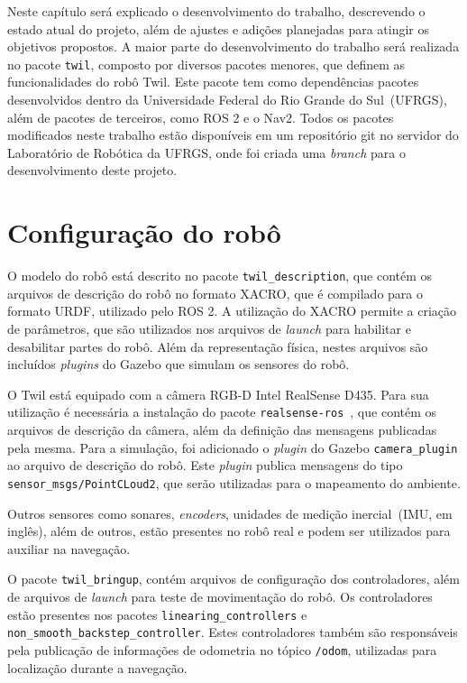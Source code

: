 \documentclass[repeatfields,xlists,xpacks,oneside,yearsonly]{ufrgscca}
\begin{document}
Neste capítulo será explicado o desenvolvimento do trabalho, descrevendo o
estado atual do projeto, além de ajustes e adições planejadas para atingir
os objetivos propostos.
A maior parte do desenvolvimento do trabalho será realizada no pacote \texttt{twil},
composto por diversos pacotes menores, que definem as funcionalidades do robô Twil.
Este pacote tem como dependências pacotes desenvolvidos dentro da
Universidade Federal do Rio Grande do Sul~(UFRGS), além de pacotes de
terceiros, como ROS 2 e o Nav2.
Todos os pacotes modificados neste trabalho estão disponíveis em um repositório git
no servidor do Laboratório de Robótica da UFRGS, onde foi criada uma
\textit{branch} para o desenvolvimento deste projeto.

\section{Configuração do robô}

O modelo do robô está descrito no pacote \texttt{twil\_description}, que contém
os arquivos de descrição do robô no formato XACRO, que é compilado para o formato
URDF, utilizado pelo ROS 2.
A utilização do XACRO permite a criação de parâmetros, que são utilizados nos
arquivos de \textit{launch} para habilitar e desabilitar partes do robô.
Além da representação física, nestes arquivos são incluídos \textit{plugins}
do Gazebo que simulam os sensores do robô.

O Twil está equipado com a câmera RGB-D Intel RealSense D435.
Para sua utilização é necessária a instalação do pacote
\texttt{realsense-ros}~\cite{realsense_ros}, que contém os arquivos de
descrição da câmera, além da definição das mensagens publicadas pela mesma.
Para a simulação, foi adicionado o \textit{plugin} do Gazebo
\texttt{camera\_plugin} ao arquivo de descrição do robô.
Este \textit{plugin} publica mensagens do tipo \texttt{sensor\_msgs/PointCLoud2}, que
serão utilizadas para o mapeamento do ambiente.

Outros sensores como sonares, \textit{encoders},
unidades de medição inercial~(IMU, em inglês), além de outros, estão presentes no
robô real e podem ser utilizados para auxiliar na navegação.

O pacote \texttt{twil\_bringup}, contém arquivos de configuração dos
controladores, além de arquivos de \textit{launch} para teste de movimentação
do robô.
Os controladores estão presentes nos pacotes \texttt{linearing\_controllers} e
\texttt{non\_smooth\_backstep\_controller}.
Estes controladores também são responsáveis pela publicação de
informações de odometria no tópico \texttt{/odom}, utilizadas para localização
durante a navegação.
\end{document}
